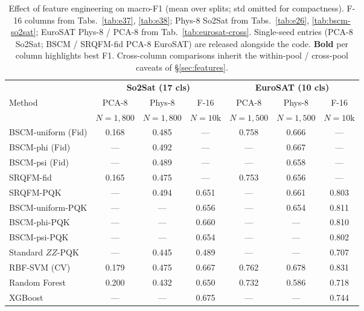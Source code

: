 \documentclass[pdflatex,sn-mathphys]{sn-jnl}
\theoremstyle{plain}
\theoremstyle{remark}
\theoremstyle{definition}
\begin{document}
\begin{table}[htbp]
\caption{Effect of feature engineering on macro-F1 (mean over splits; std omitted for compactness).  F-16 columns from Tabs.~\ref{tab:e37}, \ref{tab:e38}; Phys-8 So2Sat from Tabs.~\ref{tab:e26}, \ref{tab:bscm-so2sat}; EuroSAT Phys-8 / PCA-8 from Tab.~\ref{tab:eurosat-cross}.  Single-seed entries (PCA-8 So2Sat; BSCM / SRQFM-fid PCA-8 EuroSAT) are released alongside the code.  \textbf{Bold} per column highlights best F1.  Cross-column comparisons inherit the within-pool / cross-pool caveats of \S\ref{sec:features}.}
\label{tab:feature-effect}
\begin{tabular}{l@{\hskip4pt}c@{\hskip4pt}c@{\hskip4pt}c@{\hskip6pt}c@{\hskip4pt}c@{\hskip4pt}c}
\toprule
& \multicolumn{3}{c}{\textbf{So2Sat (17 cls)}}
& \multicolumn{3}{c}{\textbf{EuroSAT (10 cls)}} \\
\cmidrule(lr){2-4} \cmidrule(lr){5-7}
Method & PCA-8 & Phys-8 & F-16 & PCA-8 & Phys-8 & F-16 \\
       & $N\!=\!1{,}800$ & $N\!=\!1{,}800$ & $N\!=\!10\text{k}$
       & $N\!=\!1{,}500$ & $N\!=\!1{,}500$ & $N\!=\!10\text{k}$ \\
\midrule
BSCM-uniform (Fid) & 0.168 & 0.485 & --- & 0.758 & 0.666 & --- \\
BSCM-phi (Fid)     & ---   & 0.492 & --- & ---   & 0.667 & --- \\
BSCM-psi (Fid)     & ---   & 0.489 & --- & ---   & 0.658 & --- \\
SRQFM-fid          & 0.165 & 0.475 & --- & 0.753 & 0.656 & --- \\
SRQFM-PQK          & ---   & 0.494 & 0.651 & ---   & 0.661 & 0.803 \\
BSCM-uniform-PQK   & ---   & ---   & 0.656 & ---   & 0.654 & 0.811 \\
BSCM-phi-PQK       & ---   & ---   & 0.660 & ---   & ---   & 0.810 \\
BSCM-psi-PQK       & ---   & ---   & 0.654 & ---   & ---   & 0.802 \\
Standard $ZZ$-PQK  & ---   & 0.445 & 0.489 & ---   & ---   & 0.707 \\
\midrule
RBF-SVM (CV)       & 0.179 & 0.475 & 0.667 & 0.762 & 0.678 & 0.831 \\
Random Forest      & 0.200 & 0.432 & 0.650 & 0.732 & 0.586 & 0.718 \\
XGBoost            & ---   & ---   & 0.675 & ---   & ---   & 0.744 \\
\bottomrule
\end{tabular}
\end{table}
\end{document}
